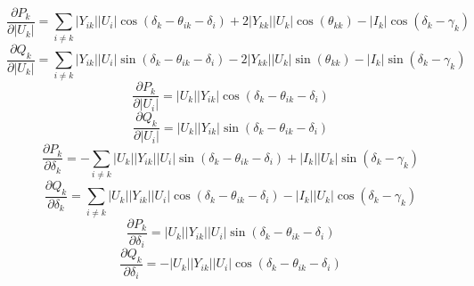 \begin{equation}
	\frac{\partial P_k}{\partial |U_k|} = \sum_{i \ne k} |Y_{ik}| |U_i| \cos \left( \delta_k - \theta_{ik} - \delta_i \right) + 2 |Y_{kk}| |U_k| \cos \left( \theta_{kk} \right) - |I_k| \cos \left( \delta_k - \gamma_k \right)
\end{equation}
\begin{equation}
	\frac{\partial Q_k}{\partial |U_k|} = \sum_{i \ne k} |Y_{ik}| |U_i| \sin \left( \delta_k - \theta_{ik} - \delta_i \right) - 2 |Y_{kk}| |U_k| \sin \left( \theta_{kk} \right) - |I_k| \sin \left( \delta_k - \gamma_k \right)
\end{equation}
\begin{equation}
	\frac{\partial P_k}{\partial |U_i|} = |U_k| |Y_{ik}| \cos \left( \delta_k - \theta_{ik} - \delta_i \right)
\end{equation}
\begin{equation}
	\frac{\partial Q_k}{\partial |U_i|} = |U_k| |Y_{ik}| \sin \left( \delta_k - \theta_{ik} - \delta_i \right)
\end{equation}
\begin{equation}
	\frac{\partial P_k}{\partial \delta_k} = - \sum_{i \ne k} |U_k| |Y_{ik}| |U_i| \sin \left( \delta_k - \theta_{ik} - \delta_i \right) + |I_k| |U_k| \sin \left( \delta_k - \gamma_k \right)
\end{equation}
\begin{equation}
	\frac{\partial Q_k}{\partial \delta_k} = \sum_{i \ne k} |U_k| |Y_{ik}| |U_i| \cos \left( \delta_k - \theta_{ik} - \delta_i \right) - |I_k| |U_k| \cos \left( \delta_k - \gamma_k \right)
\end{equation}
\begin{equation}
	\frac{\partial P_k}{\partial \delta_i} = |U_k| |Y_{ik}| |U_i| \sin \left( \delta_k - \theta_{ik} - \delta_i \right)
\end{equation}
\begin{equation}
	\frac{\partial Q_k}{\partial \delta_i} = - |U_k| |Y_{ik}| |U_i| \cos \left( \delta_k - \theta_{ik} - \delta_i \right)
\end{equation}

